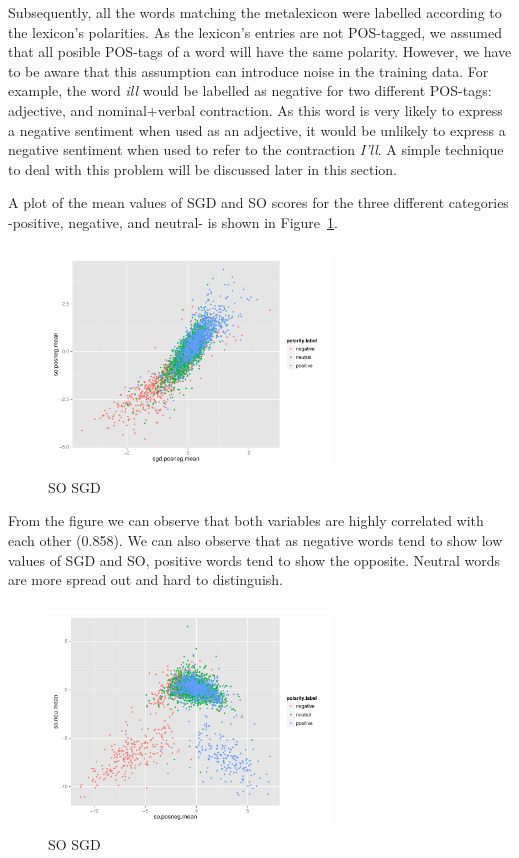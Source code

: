 \documentclass{sig-alternate}
\begin{document}
Subsequently, all the words matching the metalexicon were labelled according to the lexicon's polarities. As the lexicon's entries are not POS-tagged, we assumed that all posible POS-tags of a word will have the same polarity. However, we have to be aware that this assumption can introduce noise in the training data. For example, the word \emph{ill} would be labelled as negative for two different POS-tags: adjective, and nominal+verbal contraction. As this word is very likely to express a negative sentiment when used as an adjective, it would be unlikely to express a negative sentiment when used to refer to the  contraction \emph{I'll}. A simple technique to deal with this problem will be discussed later in this section.



A plot of the mean values of SGD and SO scores for the three different categories -positive, negative, and neutral- is shown in Figure~\ref{fig:sosgd}.


\begin{figure}[ht]
	\centering
	 \includegraphics[width=7.5cm,height=6cm]{SGDSO.pdf}
	\caption{SO SGD}
	\label{fig:sosgd}
\end{figure}


From the figure we can observe that both variables are highly correlated with each other (0.858). We can also observe that as negative words tend to show low values of SGD and SO, positive words tend to show the opposite. Neutral words are more spread out and hard to distinguish. 


\begin{figure}[ht]
	\centering
	 \includegraphics[width=7.5cm,height=6cm]{SOSO.pdf}
	\caption{SO SGD}
	\label{fig:soso}
\end{figure}
\end{document}
